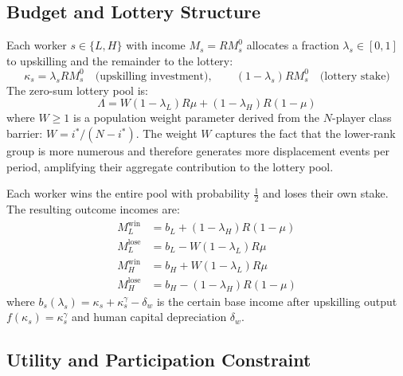 \documentclass[12pt,a4paper]{article}
\begin{document}
\subsection{Budget and Lottery Structure}

Each worker $s \in \{L, H\}$ with income $M_s = RM_s^0$ allocates a fraction
$\lambda_s \in [0,1]$ to upskilling and the remainder to the lottery:
\begin{equation}
  \kappa_s = \lambda_s R M_s^0 \quad \text{(upskilling investment)},
  \qquad
  (1-\lambda_s)RM_s^0 \quad \text{(lottery stake)}
\end{equation}
The zero-sum lottery pool is:
\begin{equation}
  \Lambda = W(1-\lambda_L)R\mu + (1-\lambda_H)R(1-\mu)
  \label{eq:pool}
\end{equation}
where $W \geq 1$ is a population weight parameter derived from the $N$-player
class barrier: $W = i^*/(N - i^*)$. The weight $W$ captures the fact that
the lower-rank group is more numerous and therefore generates more displacement
events per period, amplifying their aggregate contribution to the lottery pool.

Each worker wins the entire pool with probability $\frac{1}{2}$ and loses
their own stake. The resulting outcome incomes are:
\begin{align}
  M_L^{\mathrm{win}}  &= b_L + (1-\lambda_H)R(1-\mu) \label{eq:MLwin} \\
  M_L^{\mathrm{lose}} &= b_L - W(1-\lambda_L)R\mu \label{eq:MLlose} \\
  M_H^{\mathrm{win}}  &= b_H + W(1-\lambda_L)R\mu \label{eq:MHwin} \\
  M_H^{\mathrm{lose}} &= b_H - (1-\lambda_H)R(1-\mu) \label{eq:MHlose}
\end{align}
where $b_s(\lambda_s) = \kappa_s + \kappa_s^\gamma - \delta_w$ is the
certain base income after upskilling output $f(\kappa_s) = \kappa_s^\gamma$
and human capital depreciation $\delta_w$.

\subsection{Utility and Participation Constraint}
\end{document}
